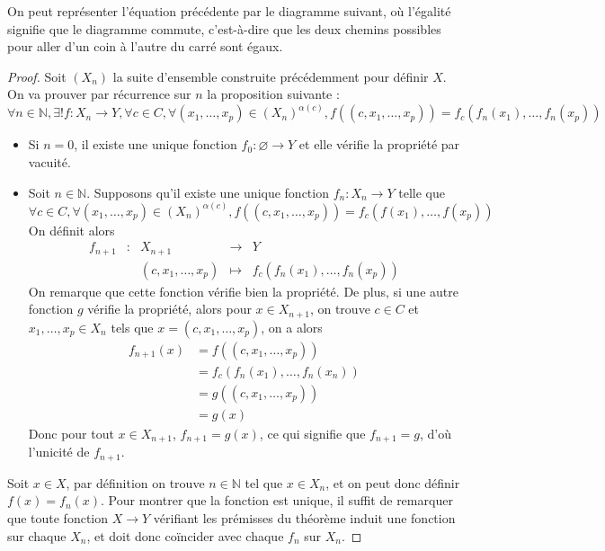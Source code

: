 On peut représenter l'équation précédente par le diagramme suivant, où l'égalité
signifie que le diagramme commute, c'est-à-dire que les deux chemins possibles
pour aller d'un coin à l'autre du carré sont égaux.

\begin{center}
\end{center}

\begin{proof}
  Soit $(X_n)$ la suite d'ensemble construite précédemment pour définir $X$. On
  va prouver par récurrence sur $n$ la proposition suivante :
  $$\forall n\in \mathbb N, \exists ! f : X_n \to Y, \forall c \in C,
  \forall (x_1,\ldots,x_p)\in (X_n)^{\alpha(c)}, f((c,x_1,\ldots,x_p))
  = f_c(f_n(x_1),\ldots,f_n(x_p))$$
  \begin{itemize}
  \item Si $n = 0$, il existe une unique fonction $f_0 : \varnothing \to Y$ et
    elle vérifie la propriété par vacuité.
  \item Soit $n \in \mathbb N$. Supposons qu'il existe une unique fonction
    $f_n : X_n \to Y$ telle que
    $$\forall c\in C, \forall (x_1,\ldots,x_p)\in (X_n)^{\alpha(c)},
    f((c,x_1,\ldots,x_p)) = f_c(f(x_1),\ldots,f(x_p))$$
    On définit alors
    $$\begin{array}{rcccl}
      f_{n+1} &:& X_{n+1} &\longrightarrow & Y \\
      & & (c,x_1,\ldots,x_p) & \longmapsto & f_c(f_n(x_1),\ldots,f_n(x_p))
    \end{array}$$
    On remarque que cette fonction vérifie bien la propriété. De plus, si une
    autre fonction $g$ vérifie la propriété, alors pour $x\in X_{n+1}$, on trouve
    $c\in C$ et $x_1,\ldots,x_p \in X_n$ tels que $x = (c,x_1,\ldots,x_p)$, on a
    alors
    \begin{align*}
      f_{n+1}(x) &= f((c,x_1,\ldots,x_p)) \\
      &= f_c(f_n(x_1),\ldots,f_n(x_n)) \\
      &= g((c,x_1,\ldots,x_p))\\
      &= g (x)
    \end{align*}
    Donc pour tout $x\in X_{n+1}$, $f_{n+1} = g(x)$, ce qui signifie que
    $f_{n+1} = g$, d'où l'unicité de $f_{n+1}$.
  \end{itemize}

  Soit $x \in X$, par définition on trouve $n\in \mathbb N$ tel que $x \in X_n$,
  et on peut donc définir $f(x) = f_n(x)$. Pour montrer que la fonction est
  unique, il suffit de remarquer que toute fonction $X \to Y$ vérifiant les
  prémisses du théorème induit une fonction sur chaque $X_n$, et doit donc
  coïncider avec chaque $f_n$ sur $X_n$.
\end{proof}

